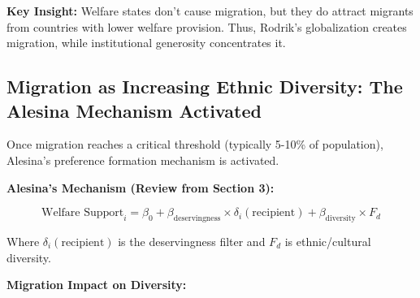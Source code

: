 \textbf{Key Insight:} Welfare states don't cause migration, but they do attract migrants from countries with lower welfare provision. Thus, Rodrik's globalization creates migration, while institutional generosity concentrates it.

\subsection{Migration as Increasing Ethnic Diversity: The Alesina Mechanism Activated}

Once migration reaches a critical threshold (typically 5-10\% of population), Alesina's preference formation mechanism is activated.

\textbf{Alesina's Mechanism (Review from Section 3):}

\begin{equation}
\text{Welfare Support}_i = \beta_0 + \beta_{\text{deservingness}} \times \delta_i(\text{recipient}) + \beta_{\text{diversity}} \times F_d
\end{equation}

Where $\delta_i(\text{recipient})$ is the deservingness filter and $F_d$ is ethnic/cultural diversity.

\textbf{Migration Impact on Diversity:}

